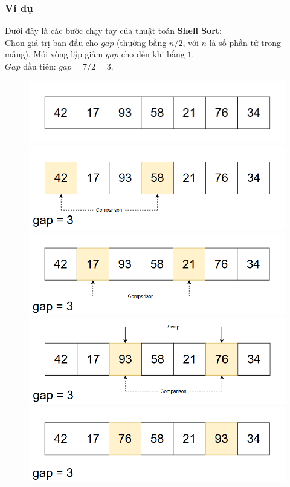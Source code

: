 \subsubsection{Ví dụ}
Dưới đây là các bước chạy tay của thuật toán \textbf{Shell Sort}:\\
Chọn giá trị ban đầu cho $gap$ (thường bằng $n/2$, với $n$ là số phần tử trong mảng). Mỗi vòng lặp giảm $gap$ cho đến khi bằng $1$.\\
$Gap$ đầu tiên: $gap = 7/2 = 3$.
\begin{figure}[H]
    \centering
    \includegraphics[width=0.5\linewidth]{img/shell_sort/1.png}
    \vspace{0.15cm}

    \includegraphics[width=0.5\linewidth]{img/shell_sort/2.png}
    \vspace{0.15cm}

    \includegraphics[width=0.5\linewidth]{img/shell_sort/3.png}
    \vspace{0.15cm}

    \includegraphics[width=0.5\linewidth]{img/shell_sort/4.png}
    \vspace{0.15cm}

    \includegraphics[width=0.5\linewidth]{img/shell_sort/5.png}
    \vspace{0.15cm}


\end{figure}
